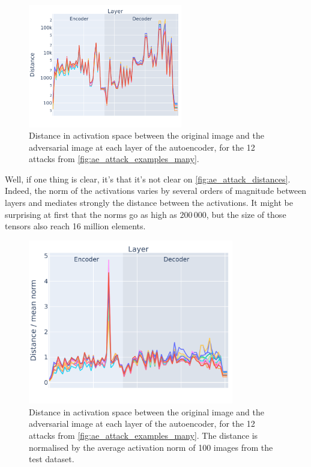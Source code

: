 \documentclass[]{scrarticle}
\begin{document}
\begin{figure}[h]
  \centering
  \includegraphics[width=0.6\textwidth]{images/ae_attack_distances.png}
  \caption{
    Distance in activation space between the original image and the adversarial image
    at each layer of the autoencoder, for the 12 attacks from
    \autoref{fig:ae_attack_examples_many}.
  }
  \label{fig:ae_attack_distances}
\end{figure}

Well, if one thing is clear, it's that it's not clear on \autoref{fig:ae_attack_distances}.
Indeed, the norm of the activations varies by several orders of magnitude
between layers and mediates strongly the distance between the activations.
It might be surprising at first that the norms go as high as $200\,000$,
but the size of those tensors also reach 16 million elements.

\begin{figure}[H]
  \centering
  \includegraphics[width=0.8\textwidth]{images/ae_attack_distances_normalized.png}
  \caption{
    Distance in activation space between the original image and the adversarial image
    at each layer of the autoencoder, for the 12 attacks from
    \autoref{fig:ae_attack_examples_many}.
    The distance is normalised by the average activation norm of 100 images
    from the test dataset.
  }
  \label{fig:ae_attack_distances_normalized}
\end{figure}
\end{document}

